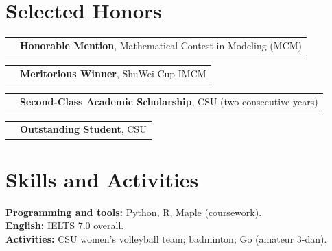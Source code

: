 \documentclass[11pt,letterpaper]{article}
\makeatletter
\newcommand{\award}[2]{\begin{tabularx}{\linewidth}{@{}l@{\hspace{10pt}}X@{}}\makebox[0.72in][l]{\small\color{muted}\strut#1} & \strut#2\end{tabularx}\par}
\makeatother
\begin{document}
\section{Selected Honors}
\award{2026}{\textbf{Honorable Mention}, Mathematical Contest in Modeling (MCM)}
\award{2025}{\textbf{Meritorious Winner}, ShuWei Cup IMCM}
\award{2024--26}{\textbf{Second-Class Academic Scholarship}, CSU (two consecutive years)}
\award{2024--25}{\textbf{Outstanding Student}, CSU}

\section{Skills and Activities}
\textbf{Programming and tools:} Python, R, Maple (coursework).\\
\textbf{English:} IELTS 7.0 overall.\\
\textbf{Activities:} CSU women's volleyball team; badminton; Go (amateur 3-dan).

\end{document}

